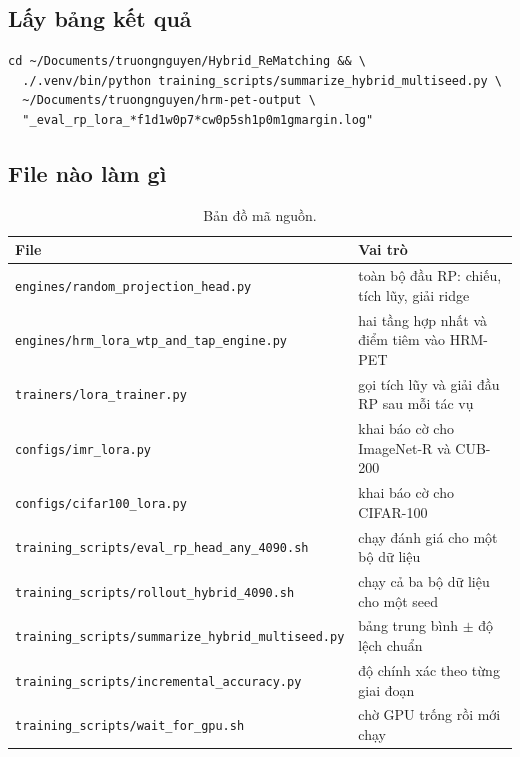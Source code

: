 \documentclass[11pt,a4paper]{article}
\begin{document}
\subsection{Lấy bảng kết quả}

\begin{footnotesize}
\begin{verbatim}
cd ~/Documents/truongnguyen/Hybrid_ReMatching && \
  ./.venv/bin/python training_scripts/summarize_hybrid_multiseed.py \
  ~/Documents/truongnguyen/hrm-pet-output \
  "_eval_rp_lora_*f1d1w0p7*cw0p5sh1p0m1gmargin.log"
\end{verbatim}
\end{footnotesize}

\subsection{File nào làm gì}

\begin{table}[htbp]
\centering
\caption{Bản đồ mã nguồn.}
\begin{tabular}{lL}
\toprule
File & Vai trò \\
\midrule
\texttt{engines/random\_projection\_head.py}
  & toàn bộ đầu RP: chiếu, tích lũy, giải ridge \\
\texttt{engines/hrm\_lora\_wtp\_and\_tap\_engine.py}
  & hai tầng hợp nhất và điểm tiêm vào HRM-PET \\
\texttt{trainers/lora\_trainer.py}
  & gọi tích lũy và giải đầu RP sau mỗi tác vụ \\
\texttt{configs/imr\_lora.py}
  & khai báo cờ cho ImageNet-R và CUB-200 \\
\texttt{configs/cifar100\_lora.py}
  & khai báo cờ cho CIFAR-100 \\
\texttt{training\_scripts/eval\_rp\_head\_any\_4090.sh}
  & chạy đánh giá cho một bộ dữ liệu \\
\texttt{training\_scripts/rollout\_hybrid\_4090.sh}
  & chạy cả ba bộ dữ liệu cho một seed \\
\texttt{training\_scripts/summarize\_hybrid\_multiseed.py}
  & bảng trung bình $\pm$ độ lệch chuẩn \\
\texttt{training\_scripts/incremental\_accuracy.py}
  & độ chính xác theo từng giai đoạn \\
\texttt{training\_scripts/wait\_for\_gpu.sh}
  & chờ GPU trống rồi mới chạy \\
\bottomrule
\end{tabular}
\end{table}
\end{document}

